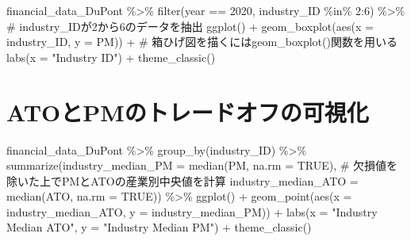 \documentclass[
  letterpaper,
  DIV=11,
  numbers=noendperiod]{scrreprt}
\newenvironment{Shaded}{\begin{snugshade}}{\end{snugshade}}
\newcommand{\AttributeTok}[1]{\textcolor[rgb]{0.40,0.45,0.13}{#1}}
\newcommand{\CommentTok}[1]{\textcolor[rgb]{0.37,0.37,0.37}{#1}}
\newcommand{\ConstantTok}[1]{\textcolor[rgb]{0.56,0.35,0.01}{#1}}
\newcommand{\DecValTok}[1]{\textcolor[rgb]{0.68,0.00,0.00}{#1}}
\newcommand{\FunctionTok}[1]{\textcolor[rgb]{0.28,0.35,0.67}{#1}}
\newcommand{\NormalTok}[1]{\textcolor[rgb]{0.00,0.23,0.31}{#1}}
\newcommand{\SpecialCharTok}[1]{\textcolor[rgb]{0.37,0.37,0.37}{#1}}
\newcommand{\StringTok}[1]{\textcolor[rgb]{0.13,0.47,0.30}{#1}}
\begin{document}
\begin{Shaded}
\begin{Highlighting}[]
\NormalTok{financial\_data\_DuPont }\SpecialCharTok{\%\textgreater{}\%} 
  \FunctionTok{filter}\NormalTok{(year }\SpecialCharTok{==} \DecValTok{2020}\NormalTok{,}
\NormalTok{         industry\_ID }\SpecialCharTok{\%in\%} \DecValTok{2}\SpecialCharTok{:}\DecValTok{6}\NormalTok{) }\SpecialCharTok{\%\textgreater{}\%} \CommentTok{\# industry\_IDが2から6のデータを抽出}
  \FunctionTok{ggplot}\NormalTok{() }\SpecialCharTok{+}
  \FunctionTok{geom\_boxplot}\NormalTok{(}\FunctionTok{aes}\NormalTok{(}\AttributeTok{x =}\NormalTok{ industry\_ID, }\AttributeTok{y =}\NormalTok{ PM)) }\SpecialCharTok{+} \CommentTok{\# 箱ひげ図を描くにはgeom\_boxplot()関数を用いる}
  \FunctionTok{labs}\NormalTok{(}\AttributeTok{x =} \StringTok{"Industry ID"}\NormalTok{) }\SpecialCharTok{+} 
  \FunctionTok{theme\_classic}\NormalTok{()}
\end{Highlighting}
\end{Shaded}

\section{ATOとPMのトレードオフの可視化}\label{atoux3068pmux306eux30c8ux30ecux30fcux30c9ux30aaux30d5ux306eux53efux8996ux5316}

\begin{Shaded}
\begin{Highlighting}[]
\NormalTok{financial\_data\_DuPont }\SpecialCharTok{\%\textgreater{}\%} 
  \FunctionTok{group\_by}\NormalTok{(industry\_ID) }\SpecialCharTok{\%\textgreater{}\%} 
  \FunctionTok{summarize}\NormalTok{(}\AttributeTok{industry\_median\_PM =} \FunctionTok{median}\NormalTok{(PM, }\AttributeTok{na.rm =} \ConstantTok{TRUE}\NormalTok{), }\CommentTok{\# 欠損値を除いた上でPMとATOの産業別中央値を計算}
            \AttributeTok{industry\_median\_ATO =} \FunctionTok{median}\NormalTok{(ATO, }\AttributeTok{na.rm =} \ConstantTok{TRUE}\NormalTok{)) }\SpecialCharTok{\%\textgreater{}\%}
  \FunctionTok{ggplot}\NormalTok{() }\SpecialCharTok{+}
  \FunctionTok{geom\_point}\NormalTok{(}\FunctionTok{aes}\NormalTok{(}\AttributeTok{x =}\NormalTok{ industry\_median\_ATO, }\AttributeTok{y =}\NormalTok{ industry\_median\_PM)) }\SpecialCharTok{+}
  \FunctionTok{labs}\NormalTok{(}\AttributeTok{x =} \StringTok{"Industry Median ATO"}\NormalTok{, }\AttributeTok{y =} \StringTok{"Industry Median PM"}\NormalTok{) }\SpecialCharTok{+}
  \FunctionTok{theme\_classic}\NormalTok{()}
\end{Highlighting}
\end{Shaded}
\end{document}

